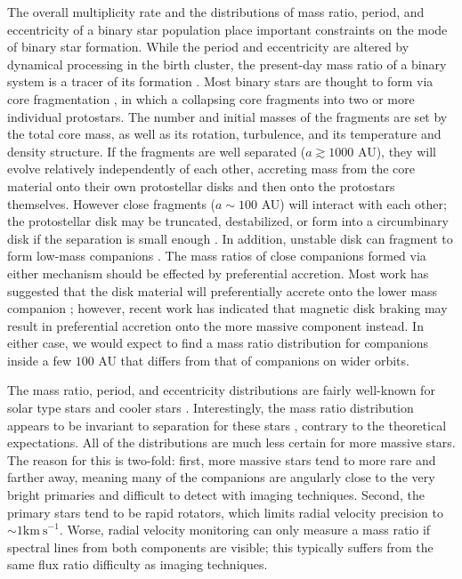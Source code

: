 \documentclass{emulateapj}
\begin{document}
The overall multiplicity rate and the distributions of mass ratio, period, and eccentricity of a binary star population place important constraints on the mode of binary star formation. While the period and eccentricity are altered by dynamical processing in the birth cluster, the present-day mass ratio of a binary system is a tracer of its formation \citep{Parker2013}. Most binary stars are thought to form via core fragmentation \citep{Boss1979, Boss1986, Bate1995}, in which a collapsing core fragments into two or more individual protostars. The number and initial masses of the fragments are set by the total core mass, as well as its rotation, turbulence, and its temperature and density structure. If the fragments are well separated ($a \gtrsim 1000$ AU), they will evolve relatively independently of each other, accreting mass from the core material onto their own protostellar disks and then onto the protostars themselves. However close fragments ($a \sim 100$ AU) will interact with each other; the protostellar disk may be truncated, destabilized, or form into a circumbinary disk if the separation is small enough \citep{Bate1997}. In addition, unstable disk can fragment to form low-mass companions \citep{Kratter2006, Stamatellos2011}. The mass ratios of close companions formed via either mechanism should be effected by preferential accretion. Most work has suggested that the disk material will preferentially accrete onto the lower mass companion \citep{Bate1997, BBB2002}; however, recent work has indicated that magnetic disk braking may result in preferential accretion onto the more massive component \citep{Zhao2013} instead. In either case, we would expect to find a mass ratio distribution for companions inside a few $100$ AU that differs from that of companions on wider orbits.

The mass ratio, period, and eccentricity distributions are fairly well-known for solar type stars \citep{Duquennoy1991, Raghavan2010} and cooler stars \citep{Fischer1992, Delfosse2004}. Interestingly, the mass ratio distribution appears to be invariant to separation for these stars \citep{Meyer2013}, contrary to the theoretical expectations. All of the distributions are much less certain for more massive stars. The reason for this is two-fold: first, more massive stars tend to more rare and farther away, meaning many of the companions are angularly close to the very bright primaries and difficult to detect with imaging techniques. Second, the primary stars tend to be rapid rotators, which limits radial velocity precision to $\sim 1 \mathrm{km\ s}^{-1}$. Worse, radial velocity monitoring can only measure a mass ratio if spectral lines from both components are visible; this typically suffers from the same flux ratio difficulty as imaging techniques. 
\end{document}

